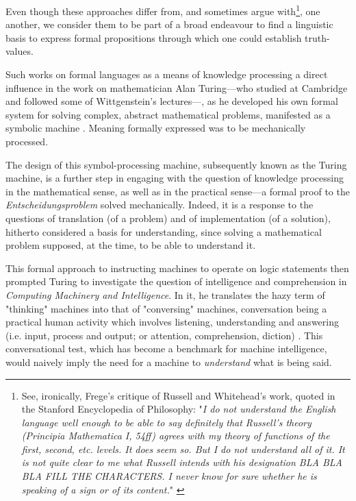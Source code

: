 Even though these approaches differ from, and sometimes argue with\footnote{See, ironically, Frege's critique of Russell and Whitehead's work, quoted in the Stanford Encyclopedia of Philosophy: "\emph{I do not understand the English language well enough to be able to say definitely that Russell's theory (Principia Mathematica I, 54ff) agrees with my theory of functions of the first, second, etc. levels. It does seem so. But I do not understand all of it. It is not quite clear to me what Russell intends with his designation BLA BLA BLA FILL THE CHARACTERS. I never know for sure whether he is speaking of a sign or of its content.}" \citep{linsky_principia_2022}}, one another, we consider them to be part of a broad endeavour to find a linguistic basis to express formal propositions through which one could establish truth-values.


Such works on formal languages as a means of knowledge processing a direct influence in the work on mathematician Alan Turing—who studied at Cambridge and followed some of Wittgenstein's lectures—, as he developed his own formal system for solving complex, abstract mathematical problems, manifested as a symbolic machine \citep{turing_computable_1936}. Meaning formally expressed was to be mechanically processed.

The design of this symbol-processing machine, subsequently known as the Turing machine, is a further step in engaging with the question of knowledge processing in the mathematical sense, as well as in the practical sense—a formal proof to the \emph{Entscheidungsproblem} solved mechanically. Indeed, it is a response to the questions of translation (of a problem) and of implementation (of a solution), hitherto considered a basis for understanding, since solving a mathematical problem supposed, at the time, to be able to understand it.

This formal approach to instructing machines to operate on logic statements then prompted Turing to investigate the question of intelligence and comprehension in \emph{Computing Machinery and Intelligence}. In it, he translates the hazy term of "thinking" machines into that of "conversing" machines, conversation being a practical human activity which involves listening, understanding and answering (i.e. input, process and output; or attention, comprehension, diction) \citep{turing_computing_2009}. This conversational test, which has become a benchmark for machine intelligence, would naively imply the need for a machine to \emph{understand} what is being said.

